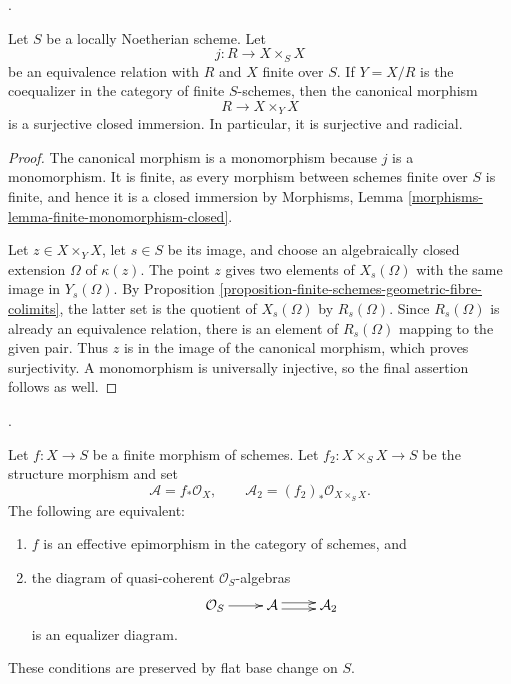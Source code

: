 \begin{lemma}
\label{lemma-finite-equivalence-relation-kernel-pair}
\begin{reference}
\cite[Expos\'e 212, p. 104]{FGA}.
\end{reference}
Let $S$ be a locally Noetherian scheme. Let
$$
j : R \longrightarrow X \times_S X
$$
be an equivalence relation with $R$ and $X$ finite over $S$. If $Y = X/R$
is the coequalizer in the category of finite $S$-schemes, then the canonical
morphism
$$
R \longrightarrow X \times_Y X
$$
is a surjective closed immersion. In particular, it is surjective and
radicial.
\end{lemma}

\begin{proof}
The canonical morphism is a monomorphism because $j$ is a monomorphism. It is
finite, as every morphism between schemes finite over $S$ is finite, and hence
it is a closed immersion by Morphisms, Lemma
\ref{morphisms-lemma-finite-monomorphism-closed}.

\medskip\noindent
Let $z \in X \times_Y X$, let $s \in S$ be its image, and choose an
algebraically closed extension $\Omega$ of $\kappa(z)$. The point $z$ gives
two elements of $X_s(\Omega)$ with the same image in $Y_s(\Omega)$. By
Proposition \ref{proposition-finite-schemes-geometric-fibre-colimits}, the
latter set is the quotient of $X_s(\Omega)$ by $R_s(\Omega)$. Since
$R_s(\Omega)$ is already an equivalence relation, there is an element of
$R_s(\Omega)$ mapping to the given pair. Thus $z$ is in the image of the
canonical morphism, which proves surjectivity. A monomorphism is universally
injective, so the final assertion follows as well.
\end{proof}

\begin{lemma}
\label{lemma-finite-effective-epimorphism-functions}
\begin{reference}
\cite[Expos\'e 190, n\textsuperscript{o} 2(b), pp. 305--306]{FGA}.
\end{reference}
Let $f : X \to S$ be a finite morphism of schemes. Let
$f_2 : X \times_S X \to S$ be the structure morphism and set
$$
\mathcal{A} = f_*\mathcal{O}_X, \qquad
\mathcal{A}_2 = (f_2)_*\mathcal{O}_{X \times_S X}.
$$
The following are equivalent:
\begin{enumerate}
\item $f$ is an effective epimorphism in the category of schemes, and
\item the diagram of quasi-coherent $\mathcal{O}_S$-algebras
$$
\xymatrix{
\mathcal{O}_S \ar[r] &
\mathcal{A} \ar@<0.5ex>[r] \ar@<-0.5ex>[r] &
\mathcal{A}_2
}
$$
is an equalizer diagram.
\end{enumerate}
These conditions are preserved by flat base change on $S$.
\end{lemma}

